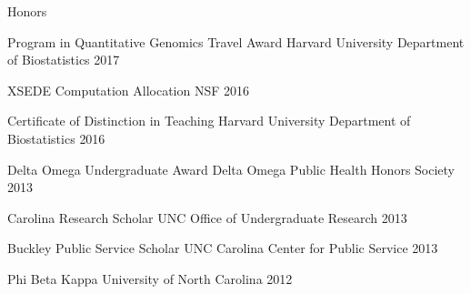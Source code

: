 Honors 
\begin{cvhonors}
	

	
	\cvhonor
	{Program in Quantitative Genomics Travel Award} %
	{Harvard University Department of Biostatistics} %
	{ } %
	{2017} %
	
	\cvhonor
	{XSEDE Computation Allocation} %
	{NSF}
	{ } %
	{2016} %
	
	\cvhonor
	{Certificate of Distinction in Teaching} %
	{Harvard University Department of Biostatistics} %
	{ } %
	{2016} %
	
	
	\cvhonor
	{Delta Omega Undergraduate Award} %
	{Delta Omega Public Health Honors Society} %
	{ } %
	{2013} %
	
	\cvhonor
	{Carolina Research Scholar} %
	{UNC Office of Undergraduate Research} %
	{ } %
	{2013} %
	
	\cvhonor
	{Buckley Public Service Scholar} %
	{UNC Carolina Center for Public Service} %
	{ } %
	{2013} %
	
	\cvhonor
	{Phi Beta Kappa} %
	{University of North Carolina} %
	{ } %
	{2012} %
\end{cvhonors}
